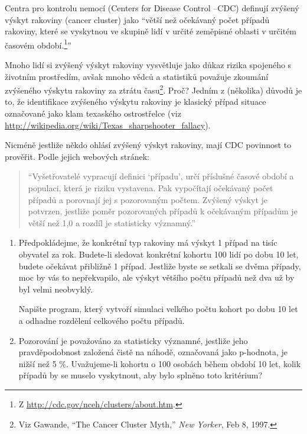 \documentclass[12pt]{book}
\begin{document}
\begin{exercise}
 Centra pro kontrolu nemocí (Centers for Disease Control --CDC) definují zvýšený výskyt rakoviny (cancer cluster)
jako ``větší než očekávaný počet případů rakoviny, které se vyskytnou ve skupině lidí v určité zeměpisné oblasti v určitém časovém období.\footnote{Z \url{http://cdc.gov/nceh/clusters/about.htm}.}''

Mnoho lidí si zvýšený výskyt rakoviny vysvětluje jako důkaz rizika spojeného s životním prostředím, avšak mnoho vědců a statistiků považuje zkoumání zvýšeného výskytu rakoviny za ztrátu času\footnote{Viz Gawande, ``The Cancer
  Cluster Myth,'' {\em New Yorker}, Feb 8, 1997.}. Proč? Jedním z (několika) důvodů je to, že identifikace zvýšeného výskytu rakoviny je klasický případ situace označované jako klam texaského ostrostřelce (viz
\url{http://wikipedia.org/wiki/Texas_sharpshooter_fallacy}).

Nicméně jestliže někdo ohlásí zvýšený výskyt rakoviny, mají CDC povinnost to prověřit. Podle jejich webových stránek:

\begin{quote}

``Vyšetřovatelé vypracují definici `případu', určí příslušné časové období a populaci, která je riziku vystavena. Pak vypočítají očekávaný počet případů a porovnají jej s pozorovaným počtem. Zvýšený výskyt je potvrzen, jestliže poměr pozorovaných případů k očekávaným případům je větší než 1,0 a rozdíl je statisticky významný.''

\end{quote}

\begin{enumerate}

\item Předpokládejme, že konkrétní typ rakoviny má výskyt 1 případ na tisíc obyvatel za rok. Budete-li sledovat konkrétní kohortu 100 lidí po dobu 10 let, budete očekávat přibližně 1 případ. Jestliže byste se setkali se dvěma případy, moc by vás to nepřekvapilo, ale výskyt většího počtu případů než dva už by byl velmi neobvyklý.

  Napište program, který vytvoří simulaci velkého počtu kohort po dobu 10 let a odhadne rozdělení celkového počtu případů.

\item Pozorování je považováno za statisticky významné, jestliže jeho pravděpodobnost založená čistě na náhodě, označovaná jako p-hodnota, je nižší než 5 \%.
  Uvažujeme-li kohortu o 100 osobách během období 10 let, kolik případů by se muselo vyskytnout, aby bylo splněno toto kritérium?


\end{enumerate}
\end{exercise}
\end{document}
